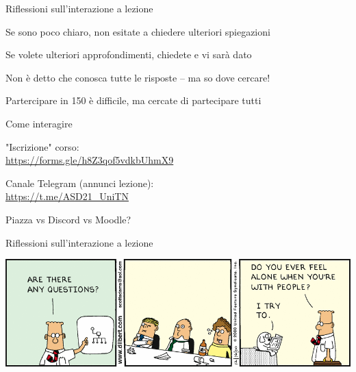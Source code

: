 \begin{frame}{Riflessioni sull'interazione a lezione}

\vspace{-12pt}
\begin{myboxtitle}
\BI
\item Se sono poco chiaro, non esitate a chiedere ulteriori spiegazioni
\item Se volete ulteriori approfondimenti, chiedete e vi sarà dato
\item Non è detto che conosca tutte le risposte -- ma so dove cercare!
\EI
\end{myboxtitle}
\begin{myboxtitle}
\BI
\item Partercipare in 150 è difficile, ma cercate di partecipare tutti
\EI
\end{myboxtitle}
\end{frame}

\begin{frame}{Come interagire}

\BIL
\item "Iscrizione" corso:\\
\url{https://forms.gle/h8Z3qof5vdkbUhmX9}
\item Canale Telegram (annunci lezione):\\
\url{https://t.me/ASD21_UniTN}
\item Piazza vs Discord vs Moodle?
\EIL

\end{frame}

\begin{frame}{Riflessioni sull'interazione a lezione}
	
\begin{center}
\includegraphics[width=\linewidth,height=\textheight,keepaspectratio]{questions.png}
\end{center}
\end{frame}


